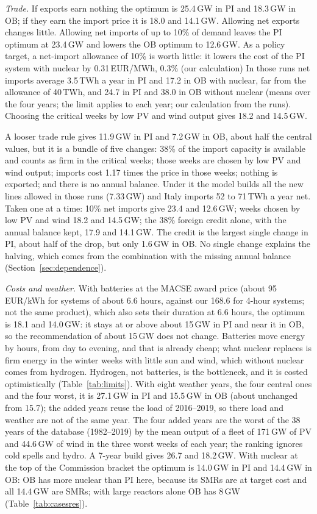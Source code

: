 \emph{Trade.} If exports earn nothing the optimum is 25.4\,GW in PI and 18.3\,GW in OB; if they earn the import price it is 18.0 and 14.1\,GW. Allowing net exports changes little. Allowing net imports of up to 10\% of demand leaves the PI optimum at 23.4\,GW and lowers the OB optimum to 12.6\,GW. As a policy target, a net-import allowance of 10\% is worth little: it lowers the cost of the PI system with nuclear by 0.31\,EUR/MWh, 0.3\% (our calculation) In those runs net imports average 3.5\,TWh a year in PI and 17.2 in OB with nuclear, far from the allowance of 40\,TWh, and 24.7 in PI and 38.0 in OB without nuclear (means over the four years; the limit applies to each year; our calculation from the runs). Choosing the critical weeks by low PV and wind output gives 18.2 and 14.5\,GW.

A looser trade rule gives 11.9\,GW in PI and 7.2\,GW in OB, about half the central values, but it is a bundle of five changes: 38\% of the import capacity is available and counts as firm in the critical weeks; those weeks are chosen by low PV and wind output; imports cost 1.17 times the price in those weeks; nothing is exported; and there is no annual balance. Under it the model builds all the new lines allowed in those runs (7.33\,GW) and Italy imports 52 to 71\,TWh a year net. Taken one at a time: 10\% net imports give 23.4 and 12.6\,GW; weeks chosen by low PV and wind 18.2 and 14.5\,GW; the 38\% foreign credit alone, with the annual balance kept, 17.9 and 14.1\,GW. The credit is the largest single change in PI, about half of the drop, but only 1.6\,GW in OB. No single change explains the halving, which comes from the combination with the missing annual balance (Section~\ref{sec:dependence}).

\emph{Costs and weather.} With batteries at the MACSE award price (about 95\,EUR/kWh for systems of about 6.6 hours, against our 168.6 for 4-hour systems; not the same product), which also sets their duration at 6.6 hours, the optimum is 18.1 and 14.0\,GW: it stays at or above about 15\,GW in PI and near it in OB, so the recommendation of about 15\,GW does not change. Batteries move energy by hours, from day to evening, and that is already cheap; what nuclear replaces is firm energy in the winter weeks with little sun and wind, which without nuclear comes from hydrogen. Hydrogen, not batteries, is the bottleneck, and it is costed optimistically (Table~\ref{tab:limits}). With eight weather years, the four central ones and the four worst, it is 27.1\,GW in PI and 15.5\,GW in OB (about unchanged from 15.7); the added years reuse the load of 2016--2019, so there load and weather are not of the same year. The four added years are the worst of the 38 years of the database (1982--2019) by the mean output of a fleet of 171\,GW of PV and 44.6\,GW of wind in the three worst weeks of each year; the ranking ignores cold spells and hydro. A 7-year build gives 26.7 and 18.2\,GW. With nuclear at the top of the Commission bracket the optimum is 14.0\,GW in PI and 14.4\,GW in OB: OB has more nuclear than PI here, because its SMRs are at target cost and all 14.4\,GW are SMRs; with large reactors alone OB has 8\,GW (Table~\ref{tab:casesres}).

